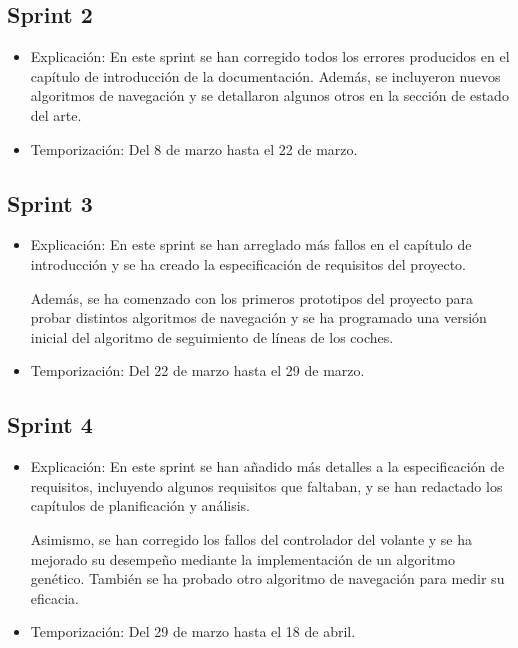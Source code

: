 \subsection{Sprint 2}
\begin{itemize}
    \item Explicación: En este sprint se han corregido todos los errores producidos en el capítulo de introducción de la documentación. Además, se incluyeron nuevos algoritmos de navegación y se detallaron algunos otros en la sección de estado del arte.
    \item Temporización: Del 8 de marzo hasta el 22 de marzo. 
\end{itemize}

\subsection{Sprint 3}
\begin{itemize}
    \item Explicación: En este sprint se han arreglado más fallos en el capítulo de introducción y se ha creado la especificación de requisitos del proyecto.
    
    Además, se ha comenzado con los primeros prototipos del proyecto para probar distintos algoritmos de navegación y se ha programado una versión inicial del algoritmo de seguimiento de líneas de los coches.
    \item Temporización: Del 22 de marzo hasta el 29 de marzo.
\end{itemize}


\subsection{Sprint 4}
\begin{itemize}
    \item Explicación: En este sprint se han añadido más detalles a la especificación de requisitos, incluyendo algunos requisitos que faltaban, y se han redactado los capítulos de planificación y análisis.
    
    Asimismo, se han corregido los fallos del controlador del volante y se ha mejorado su desempeño mediante la implementación de un algoritmo genético. También se ha probado otro algoritmo de navegación para medir su eficacia.
    \item Temporización: Del 29 de marzo hasta el 18 de abril.
\end{itemize}

